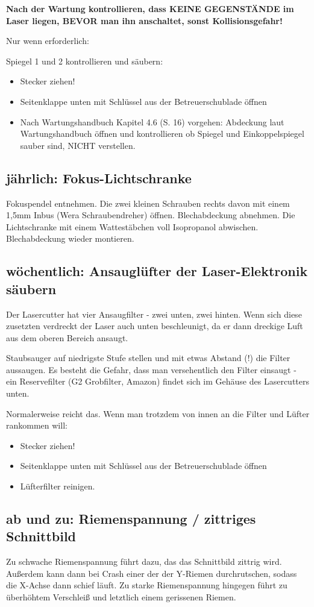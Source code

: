 \documentclass{\basedir/fablab-document}
\begin{document}
\textbf{Nach der Wartung kontrollieren, dass KEINE GEGENSTÄNDE im Laser liegen, BEVOR man ihn anschaltet, sonst Kollisionsgefahr!}

	Nur wenn erforderlich:

	Spiegel 1 und 2 kontrollieren und säubern:
	\begin{itemize}
		\item Stecker ziehen!
		\item Seitenklappe unten mit Schlüssel aus der Betreuerschublade öffnen
		\item Nach Wartungshandbuch Kapitel 4.6 (S. 16) vorgehen: Abdeckung laut Wartungshandbuch öffnen und kontrollieren ob Spiegel und Einkoppelspiegel sauber sind, NICHT verstellen.
	\end{itemize}

\subsection{jährlich: Fokus-Lichtschranke}
Fokuspendel entnehmen. Die zwei kleinen Schrauben rechts davon mit einem 1,5mm Inbus (Wera Schraubendreher) öffnen. Blechabdeckung abnehmen. Die Lichtschranke mit einem Wattestäbchen voll Isopropanol abwischen. Blechabdeckung wieder montieren.

\subsection{wöchentlich: Ansauglüfter der Laser-Elektronik säubern}
	Der Lasercutter hat vier Ansaugfilter - zwei unten, zwei hinten. Wenn sich diese zusetzten verdreckt der Laser auch unten beschleunigt, da er dann dreckige Luft aus dem oberen Bereich ansaugt.

	 Staubsauger auf niedrigste Stufe stellen und mit etwas Abstand (!) die Filter aussaugen. Es besteht die Gefahr, dass man versehentlich den Filter einsaugt - ein Reservefilter (G2 Grobfilter, Amazon) findet sich im Gehäuse des Lasercutters unten.

	Normalerweise reicht das. Wenn man trotzdem von innen an die Filter und Lüfter rankommen will:
	\begin{itemize}
		\item Stecker ziehen!
		\item Seitenklappe unten mit Schlüssel aus der Betreuerschublade öffnen
		\item Lüfterfilter reinigen.
	\end{itemize}

\subsection{ab und zu: Riemenspannung / zittriges Schnittbild}
	Zu schwache Riemenspannung führt dazu, das das Schnittbild zittrig wird. Außerdem kann dann bei Crash einer der der Y-Riemen durchrutschen, sodass die X-Achse dann schief läuft. Zu starke Riemenspannung hingegen führt zu überhöhtem Verschleiß und letztlich einem gerissenen Riemen.
\end{document}
